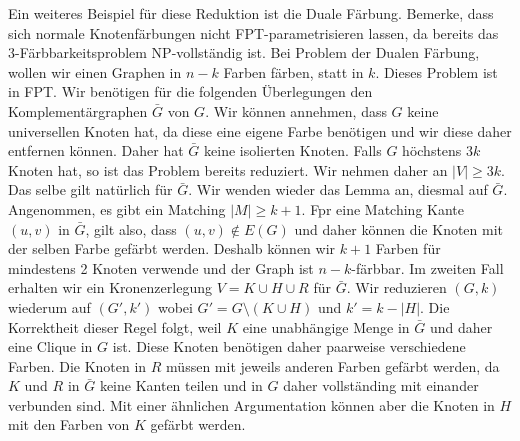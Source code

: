\documentclass[a4paper, 12pt]{article}
\theoremstyle{plain}
\theoremstyle{definition}
\theoremstyle{lemma}
\theoremstyle{remark}
\theoremstyle{corollary}
\theoremstyle{example}
\begin{document}
	Ein weiteres Beispiel für diese Reduktion ist die Duale Färbung. Bemerke, dass sich normale Knotenfärbungen nicht FPT-parametrisieren lassen, da bereits das 3-Färbbarkeitsproblem NP-vollständig ist. Bei Problem der Dualen Färbung, wollen wir einen Graphen in $n-k$ Farben färben, statt in $k$. Dieses Problem ist in FPT. Wir benötigen für die folgenden Überlegungen den Komplementärgraphen $\bar{G}$ von $G$. Wir können annehmen, dass $G$ keine universellen Knoten hat, da diese eine eigene Farbe benötigen und wir diese daher entfernen können. Daher hat $\bar{G}$ keine isolierten Knoten. Falls $G$ höchstens $3k$ Knoten hat, so ist das Problem bereits reduziert. Wir nehmen daher an $\left|V\right| \geq 3k$. Das selbe gilt natürlich für $\bar{G}$. Wir wenden wieder das Lemma an, diesmal auf $\bar{G}$. Angenommen, es gibt ein Matching $\left|M\right| \geq k+1$. Fpr eine Matching Kante $(u,v)$ in $\bar{G}$, gilt also, dass $(u,v) \notin E(G)$ und daher können die Knoten mit der selben Farbe gefärbt werden. Deshalb können wir $k+1$ Farben für mindestens 2 Knoten verwende und der Graph ist $n-k$-färbbar. Im zweiten Fall erhalten wir ein Kronenzerlegung $V = K\cup H \cup R$ für $\bar{G}$. Wir reduzieren $(G,k)$ wiederum auf $(G',k')$ wobei $G' = G \setminus (K\cup H)$ und $k' = k - \left|H\right|$. Die Korrektheit dieser Regel folgt, weil $K$ eine unabhängige Menge in $\bar{G}$ und daher eine Clique in $G$ ist. Diese Knoten benötigen daher paarweise verschiedene Farben. Die Knoten in $R$ müssen mit jeweils anderen Farben gefärbt werden, da $K$ und $R$ in $\bar{G}$ keine Kanten teilen und in $G$ daher vollständing mit einander verbunden sind. Mit einer ähnlichen Argumentation können aber die Knoten in $H$ mit den Farben von $K$ gefärbt werden.
\end{document}
